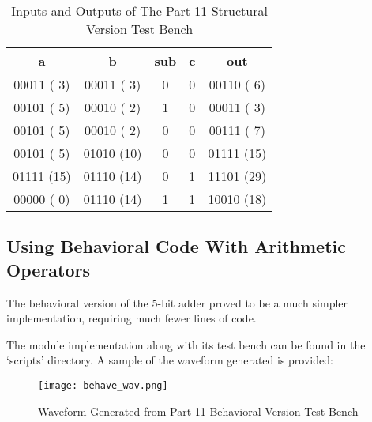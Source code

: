 \documentclass[paper=usletter, fontsize=12pt]{article}
\begin{document}
        \begin{table}[h]
            \caption{Inputs and Outputs of The Part 11 Structural Version Test Bench}

            \centering
            \begin{tabular*}{200pt}{@{\extracolsep{\fill}} ccccc}

            \textbf{a} & \textbf{b} & \textbf{sub} & \textbf{c} & \textbf{out} \\
            \hline
            00011 ( 3) & 00011 ( 3) & 0 & 0 & 00110 ( 6) \\
            00101 ( 5) & 00010 ( 2) & 1 & 0 & 00011 ( 3) \\
            00101 ( 5) & 00010 ( 2) & 0 & 0 & 00111 ( 7) \\
            00101 ( 5) & 01010 (10) & 0 & 0 & 01111 (15) \\
            01111 (15) & 01110 (14) & 0 & 1 & 11101 (29) \\
            00000 ( 0) & 01110 (14) & 1 & 1 & 10010 (18) \\
            \end{tabular*}
        \end{table}

        \newpage

        \subsection{Using Behavioral Code With Arithmetic Operators}
        The behavioral version of the 5-bit adder proved to be a much simpler implementation, requiring much fewer lines of code.

        The module implementation along with its test bench can be found in the `scripts' directory. A sample of the waveform generated is provided:

        \begin{figure}[ht]
            \begin{center}
                \texttt{[image: behave\_wav.png]}
                \caption{Waveform Generated from Part 11 Behavioral Version Test Bench} \label{fig:behave_wav}
            \end{center}
        \end{figure}
\end{document}
